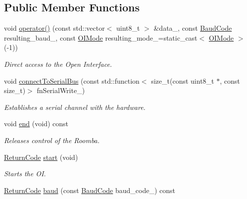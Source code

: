\subsection*{Public Member Functions}
\begin{DoxyCompactItemize}
\item 
void \hyperlink{classroomba_1_1series500_1_1oi_1_1_o_i_encoder_af84c9d7d238d3ae55ca51f86e351db12}{operator()} (const std\+::vector$<$ uint8\+\_\+t $>$ \&data\+\_\+, const \hyperlink{namespaceroomba_1_1series500_1_1oi_ae5028fe52e1dabe309aff04a45581bfd}{Baud\+Code} resulting\+\_\+baud\+\_\+, const \hyperlink{namespaceroomba_1_1series500_1_1oi_a8dde6b4ac23e862ae50868c3963d7063}{O\+I\+Mode} resulting\+\_\+mode\+\_\+=static\+\_\+cast$<$ \hyperlink{namespaceroomba_1_1series500_1_1oi_a8dde6b4ac23e862ae50868c3963d7063}{O\+I\+Mode} $>$(-\/1))
\begin{DoxyCompactList}\small\item\em Direct access to the Open Interface. \end{DoxyCompactList}\item 
void \hyperlink{classroomba_1_1series500_1_1oi_1_1_o_i_encoder_ac70158274e90759a4d93ccf27a076c47}{connect\+To\+Serial\+Bus} (const std\+::function$<$ size\+\_\+t(const uint8\+\_\+t $\ast$, const size\+\_\+t)$>$ fn\+Serial\+Write\+\_\+)
\begin{DoxyCompactList}\small\item\em Establishes a serial channel with the hardware. \end{DoxyCompactList}\item 
void \hyperlink{classroomba_1_1series500_1_1oi_1_1_o_i_encoder_ac4b19dd3355212072fd27700e6d239ad}{end} (void) const 
\begin{DoxyCompactList}\small\item\em Releases control of the Roomba. \end{DoxyCompactList}\item 
\hyperlink{classroomba_1_1series500_1_1oi_1_1_o_i_encoder_ac2c8ad2f0306050926f89882d74696cc}{Return\+Code} \hyperlink{classroomba_1_1series500_1_1oi_1_1_o_i_encoder_a1601020b3fbf4e02e5cd2cf87fbf4432}{start} (void)
\begin{DoxyCompactList}\small\item\em Starts the O\+I. \end{DoxyCompactList}\item 
\hyperlink{classroomba_1_1series500_1_1oi_1_1_o_i_encoder_ac2c8ad2f0306050926f89882d74696cc}{Return\+Code} \hyperlink{classroomba_1_1series500_1_1oi_1_1_o_i_encoder_a063c0c08f5d6ac8fd97d2cbdd4e9f3f9}{baud} (const \hyperlink{namespaceroomba_1_1series500_1_1oi_ae5028fe52e1dabe309aff04a45581bfd}{Baud\+Code} baud\+\_\+code\+\_\+) const 

\end{DoxyCompactItemize}
